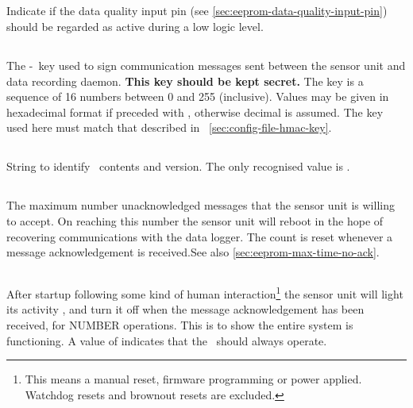 \subsection[data-quality-input-active-low]{}
\label{sec:eeprom-data-quality-input-active-low}
Indicate if the data quality input pin (see
\ref{sec:eeprom-data-quality-input-pin}) should be regarded as active
during a low logic level.

\subsection[hmac-key]{}
\label{sec:eeprom-hmac-key}

The \hmac-\mdfive\ key used to sign communication messages sent between the
sensor unit and data recording daemon. \textbf{This key should be kept secret.}
The key is a sequence of 16 numbers between 0 and 255 (inclusive). Values may be
given in hexadecimal format if preceded with , otherwise decimal is
assumed. The key used here must match that described in
\secname~\ref{sec:config-file-hmac-key}.

\subsection[magic]{}

String to identify \eeprom\ contents and version. The only recognised value is
.

\subsection[max-message-no-ack]{}
\label{sec:eeprom-max-message-no-ack}
The maximum number unacknowledged messages that the sensor unit is
willing to accept. On reaching this number the sensor unit will reboot
in the hope of recovering communications with the data logger. The
count is reset whenever a message acknowledgement is received.See also
\ref{sec:eeprom-max-time-no-ack}.

\subsection[max-messages-led]{}

After startup following some kind of human interaction\footnote{This
  means a manual reset, firmware programming or power
  applied. Watchdog resets and brownout resets are excluded.} the
sensor unit will light its activity \led, and turn it off when the
message acknowledgement has been received, for NUMBER
operations. This is to show the entire system is functioning. A value
of  indicates that the \led\ should always
operate. 

